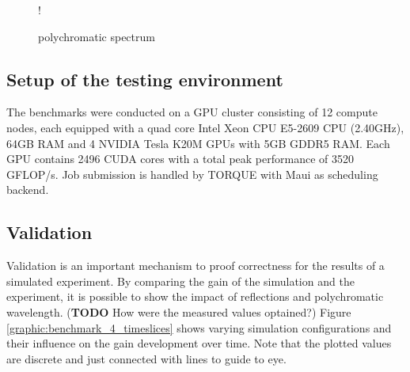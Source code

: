 \begin{figure}[H]
  \centerline{
     {!} {}
  }
  \caption{polychromatic spectrum}
  \label{plot:polychromatic_spectrum}
\end{figure}

\subsection{Setup of the testing environment}
\label{subsec:testingEnvironment}

The benchmarks were conducted on a GPU cluster consisting of 12 compute nodes,
each equipped with a quad core Intel Xeon CPU E5-2609 CPU (2.40GHz), 64GB RAM
and 4 NVIDIA Tesla K20M GPUs with 5GB GDDR5 RAM. Each GPU contains 2496 CUDA cores with a total
peak performance of 3520 GFLOP/s. Job submission is handled by TORQUE\cite{torque} 
with Maui\cite{maui} as scheduling backend. 


\subsection{Validation}
\label{subsec:validation}
Validation is an important mechanism to proof correctness for
the results of a simulated experiment. By comparing the gain 
of the simulation and the experiment, 
it is possible to show the impact of reflections and polychromatic
wavelength. (\textbf{TODO} How were the measured values optained?) Figure \ref{graphic:benchmark_4_timeslices} shows
varying simulation configurations and their influence on the
gain development over time. Note that the plotted values are
discrete and just connected with lines to guide to eye.

